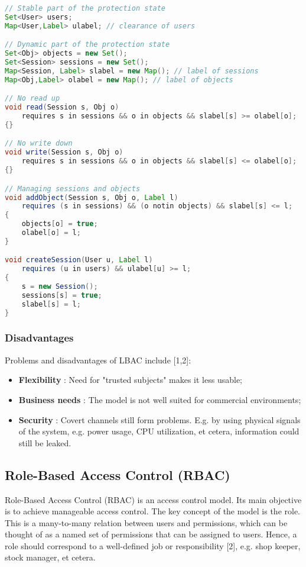 \begin{lstlisting}[language=java, caption=Security automaton for LBAC., label=listing:lbac]
// Stable part of the protection state
Set<User> users; 
Map<User,Label> ulabel; // clearance of users

// Dynamic part of the protection state
Set<Obj> objects = new Set(); 
Set<Session> sessions = new Set();
Map<Session, Label> slabel = new Map(); // label of sessions
Map<Obj,Label> olabel = new Map(); // label of objects

// No read up
void read(Session s, Obj o) 
	requires s in sessions && o in objects && slabel[s] >= olabel[o];
{}

// No write down
void write(Session s, Obj o)
	requires s in sessions && o in objects && slabel[s] <= olabel[o];
{}

// Managing sessions and objects
void addObject(Session s, Obj o, Label l) 
	requires (s in sessions) && (o notin objects) && slabel[s] <= l;
{
	objects[o] = true;
	olabel[o] = l;
}

void createSession(User u, Label l) 
	requires (u in users) && ulabel[u] >= l;
{
	s = new Session();
	sessions[s] = true; 
	slabel[s] = l;
}
\end{lstlisting}


\subsubsection{Disadvantages}

Problems and disadvantages of LBAC include [1,2]:
\begin{itemize}
	\item \textbf{Flexibility} : Need for "trusted subjects" makes it less usable;
	\item \textbf{Business needs} : The model is not well suited for commercial environments;
	\item \textbf{Security} : Covert channels still form problems. E.g. by using physical signals of the system, e.g. power usage, CPU utilization, et cetera, information could still be leaked.
\end{itemize}



\subsection{Role-Based Access Control (RBAC)}

Role-Based Access Control (RBAC) is an access control model. Its main objective is to achieve manageable access control. The key concept of the model is the role. This is a many-to-many relation between users and permissions, which can be thought of as a named set of permissions that can be assigned to users. Hence, a role should correspond to a well-defined job or responsibility [2], e.g. shop keeper, stock manager, et cetera.

